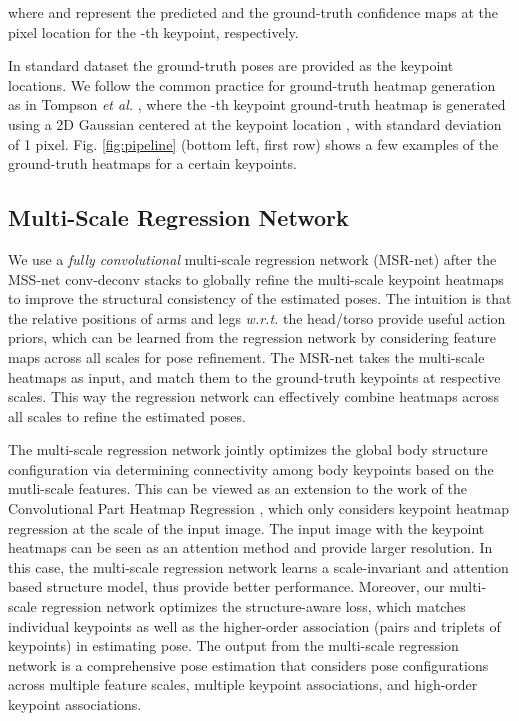 \documentclass[runningheads]{llncs}
\begin{document}
where  and  represent the predicted and the ground-truth confidence maps at the pixel location  for the -th keypoint, respectively. 

In standard dataset the ground-truth poses are provided as the keypoint locations. We follow the common practice for ground-truth heatmap generation as in Tompson {\em et al.} \cite{tompson2014joint}, where the -th keypoint ground-truth heatmap  is generated using a 2D Gaussian centered at the keypoint location , with standard deviation of 1 pixel.
Fig. \ref{fig:pipeline} (bottom left, first row) shows a few examples of the ground-truth heatmaps for a certain keypoints. 


\subsection{Multi-Scale Regression Network}
\label{sec:global:regression:network}



We use a {\em fully convolutional} multi-scale regression network (MSR-net) after the MSS-net conv-deconv stacks to globally refine the multi-scale keypoint heatmaps to improve the structural consistency of the estimated poses. 
The intuition is that the relative positions of arms and legs {\em w.r.t.} the head/torso provide useful action priors, which can be learned from the regression network by considering feature maps across all scales for pose refinement. The MSR-net takes the multi-scale heatmaps as input, and match them to the ground-truth keypoints at respective scales. This way the regression network can effectively combine heatmaps across all scales to refine the estimated poses.



The multi-scale regression network jointly optimizes the global body structure configuration via determining connectivity among body keypoints based on the mutli-scale features. This can be viewed as an extension to the work of the Convolutional Part Heatmap Regression \cite{bulat2016human}, which only considers keypoint heatmap regression at the scale of the input image. The input image with the keypoint heatmaps can be seen as an attention method and provide larger resolution. 
In this case, the multi-scale regression network learns a scale-invariant and attention based structure model, thus provide better performance. Moreover, our multi-scale regression network optimizes the structure-aware loss, which matches individual keypoints as well as the higher-order association (pairs and triplets of keypoints) in estimating pose.
The output from the multi-scale regression network is a comprehensive pose estimation that considers pose configurations across multiple feature scales, multiple keypoint associations, and high-order keypoint associations.
\end{document}

